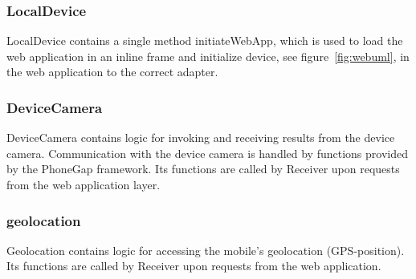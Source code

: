 \subsubsection{LocalDevice}
LocalDevice contains a single method initiateWebApp, which is used to load the web application in an inline frame and initialize device, see figure~\ref{fig:webuml}, in the web application to the correct adapter.

\subsubsection{DeviceCamera}
DeviceCamera contains logic for invoking and receiving results from the device camera. Communication with the device camera is handled by functions provided by the PhoneGap framework. Its functions are called by Receiver upon requests from the web application layer.

\subsubsection{geolocation}
Geolocation contains logic for accessing the mobile's geolocation (GPS-position). Its functions are called by Receiver upon requests from the web application.

